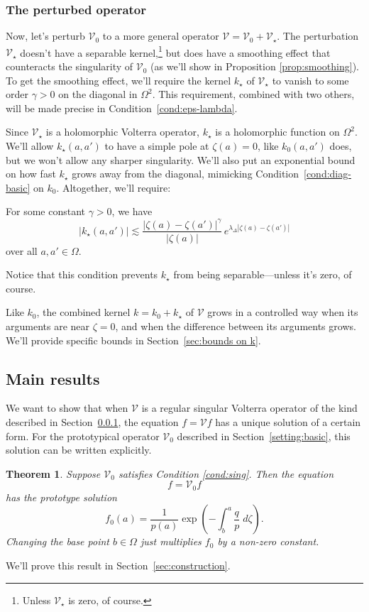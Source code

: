 \documentclass{article}
\makeatletter
\theoremstyle{plain}
\newtheorem{thm}{Theorem}
\newcommand{\condconst}[2]{\item[($\text{\textsc{#1}} \mid #2$)]\protected@edef\@currentlabel{$\text{\textsc{#1}} \mid #2$}}
\newcommand{\volterra}{\mathcal{V}}
\newcommand{\hardpart}{\mathcal{V}_0}
\newcommand{\softpart}{\mathcal{V}_\star}
\newcommand{\hardker}{k_0}
\newcommand{\softker}{k_\star}
\newcommand{\solproto}{f_0}
\newcommand{\domain}{\Omega}
\makeatother
\begin{document}
\subsubsection{The perturbed operator}\label{setting:perturbed}

Now, let's perturb $\hardpart$ to a more general operator $\volterra=\hardpart +\softpart$. The perturbation $\softpart$ doesn't have a separable kernel,\footnote{Unless $\softpart$ is zero, of course.} but does have a smoothing effect that counteracts the singularity of $\hardpart$ (as we'll show in Proposition \ref{prop:smoothing}). To get the smoothing effect, we'll require the kernel $\softker$ of $\softpart$ to vanish to some order $\gamma > 0$ on the diagonal in $\domain^2$. This requirement, combined with two others, will be made precise in Condition~\eqref{cond:eps-lambda}.

Since $\softpart$ is a holomorphic Volterra operator, $\softker$ is a holomorphic function on $\domain^2$. We'll allow $\softker(a, a')$ to have a simple pole at $\zeta(a) = 0$, like $\hardker(a, a')$ does, but we won't allow any sharper singularity. We'll also put an exponential bound on how fast $\softker$ grows away from the diagonal, mimicking Condition~\eqref{cond:diag-basic} on $\hardker$. Altogether, we'll require:
\begin{conditions}
\condconst{diag$_\star$}{\gamma, \lambda_\Delta}\label{cond:eps-lambda} For some constant $\gamma > 0$, we have
\[ \big| \softker(a, a') \big| \lesssim\frac{|\zeta(a)-\zeta(a')|^\gamma}{|\zeta(a)|}\,e^{\lambda_\Delta|\zeta(a)-\zeta(a')|}\]
over all $a, a' \in \domain$.
\end{conditions}
Notice that this condition prevents $\softker$ from being separable---unless it's zero, of course.

Like $\hardker$, the combined kernel $k = \hardker + \softker$ of $\volterra$ grows in a controlled way when its arguments are near $\zeta = 0$, and when the difference between its arguments grows. We'll provide specific bounds in Section~\ref{sec:bounds on k}. 

\subsection{Main results}\label{sec:results}
We want to show that when $\volterra$ is a regular singular Volterra operator of the kind described in Section~\ref{setting:perturbed}, the equation $f = \volterra f$ has a unique solution of a certain form. For the prototypical operator $\hardpart$ described in Section~\ref{setting:basic}, this solution can be written explicitly.
\begin{thm}\label{thm:basic_volterra}
Suppose $\hardpart$ satisfies {\em Condition \eqref{cond:sing}}. Then the equation
\[ f = \hardpart f \]
has the {\em prototype solution}
\begin{equation}\label{eqn:test_solution}
\solproto(a) = \frac{1}{p(a)} \exp\left(-\int_{b}^{a}\frac{q}{p}\;d\zeta\right).
\end{equation}
Changing the base point $b \in \domain$ just multiplies $f_0$ by a non-zero constant.
\end{thm}
We'll prove this result in Section~\ref{sec:construction}.
\end{document}
